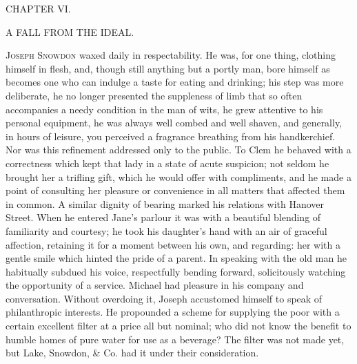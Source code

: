 {}

{CHAPTER VI.}

A FALL FROM THE IDEAL.

\textsc{Joseph Snowdon} waxed daily in respectability. He was, for one
thing, clothing himself in flesh, and, though still anything but a
portly man, bore himself as becomes one who can indulge a taste for
eating and drinking; his step was more deliberate, he no longer
presented the suppleness of limb that so often accompanies a needy
condition in the man of wits, he grew attentive to his personal
equipment, he was always well combed and well shaven, and generally, in
hours of leisure, you perceived a fragrance breathing from his
handkerchief. Nor was this refinement addressed only to the public. To
Clem he behaved with a correctness which kept that lady in a state of
acute suspicion; not seldom he brought her a trifling gift, which he
would offer with compliments, and he made a point of consulting her
{}pleasure or convenience in all matters that affected them in common. A
similar dignity of bearing marked his relations with Hanover Street.
When he entered Jane's parlour it was with a beautiful blending of
familiarity and courtesy; he took his daughter's hand with an air of
graceful affection, retaining it for a moment between his own, and
regarding: her with a gentle smile which hinted the pride of a parent.
In speaking with the old man he habitually subdued his voice,
respectfully bending forward, solicitously watching the opportunity of a
service. Michael had pleasure in his company and conversation. Without
overdoing it, Joseph accustomed himself to speak of philanthropic
interests. He propounded a scheme for supplying the poor with a certain
excellent filter at a price all but nominal; who did not know the
benefit to humble homes of pure water for use as a beverage? The filter
was not made yet, but Lake, Snowdon, \& Co. had it under their
consideration.

